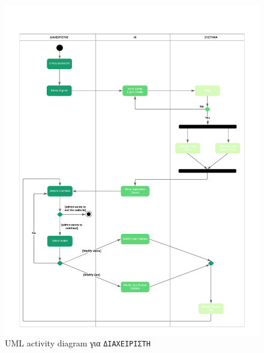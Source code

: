 \begin{figure}
	\centering\includegraphics[width = \linewidth]{uml/admin.png}
	\caption{UML activity diagram για \texttt{ΔΙΑΧΕΙΡΙΣΤΗ}}
	\label{admin}
\end{figure}